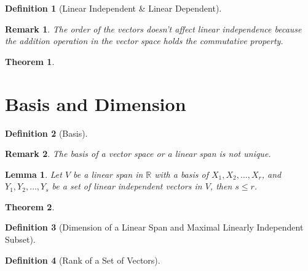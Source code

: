 \documentclass[onecolumn]{ctexart}
\newtheorem{definition}{Definition}
\newtheorem{theorem}{Theorem}
\newtheorem{lemma}{Lemma}
\newtheorem{remark}{Remark}
\begin{document}
\begin{definition}[Linear Independent \& Linear Dependent]
  
\end{definition}
\begin{remark}
  The order of the vectors doesn't affect linear independence because the 
  addition operation in the vector space holds the commutative property.
\end{remark}

\begin{theorem}
  
\end{theorem}

\section{Basis and Dimension}

\begin{definition}[Basis]
  
\end{definition}
\begin{remark}
  The basis of a vector space or a linear span is not unique.
\end{remark}

\begin{lemma}
  Let $V$ be a linear span in $\mathbb{R}$ with a basis of $X_1, X_2, \ldots, 
  X_r$, and $Y_1, Y_2, \ldots, Y_s$ be a set of linear independent vectors in 
  $V$, then $s \leq r$.
\end{lemma}

\begin{theorem}
  
\end{theorem}
\begin{definition}[Dimension of a Linear Span and Maximal Linearly Independent Subset]
  
\end{definition}

\begin{definition}[Rank of a Set of Vectors]
  
\end{definition}
\end{document}

